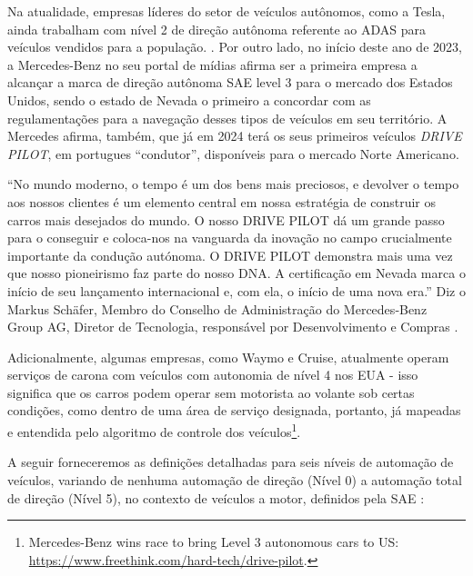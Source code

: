 Na atualidade, empresas líderes do setor de veículos autônomos, como a Tesla, ainda trabalham com nível 2 de direção autônoma referente ao ADAS para veículos vendidos para a população. \cite{4cenarios_ocidental}.
Por outro lado, no início deste ano de 2023, a Mercedes-Benz no seu portal de mídias afirma ser a primeira empresa a alcançar a marca de direção autônoma SAE level 3 para o mercado dos Estados Unidos, sendo o estado de Nevada o primeiro a concordar com as regulamentações para a navegação desses tipos de veículos em seu território. A Mercedes afirma, também, que já em 2024 terá os seus primeiros veículos \textit{DRIVE PILOT}, em portugues “condutor”, disponíveis para o mercado Norte Americano.

“No mundo moderno, o tempo é um dos bens mais preciosos, e devolver o tempo aos nossos clientes é um elemento central em nossa estratégia de construir os carros mais desejados do mundo. O nosso DRIVE PILOT dá um grande passo para o conseguir e coloca-nos na vanguarda da inovação no campo crucialmente importante da condução autónoma. O DRIVE PILOT demonstra mais uma vez que nosso pioneirismo faz parte do nosso DNA. A certificação em Nevada marca o início de seu lançamento internacional e, com ela, o início de uma nova era.” Diz o Markus Schäfer, Membro do Conselho de Administração do Mercedes‑Benz Group AG, Diretor de Tecnologia, responsável por Desenvolvimento e Compras \cite{mercedes3}.

Adicionalmente, algumas empresas, como Waymo e Cruise, atualmente operam serviços de carona com veículos com autonomia de nível 4 nos EUA - isso significa que os carros podem operar sem motorista ao volante sob certas condições, como dentro de uma área de serviço designada, portanto, já mapeadas e entendida pelo algoritmo de controle dos veículos\footnote{Mercedes-Benz wins race to bring Level 3 autonomous cars to US: \url{https://www.freethink.com/hard-tech/drive-pilot}.}.



A seguir forneceremos as definições detalhadas para seis níveis de automação de veículos, variando de nenhuma automação de direção (Nível 0) a automação total de direção (Nível 5), no contexto de veículos a motor, definidos pela SAE \cite{SAE}:


